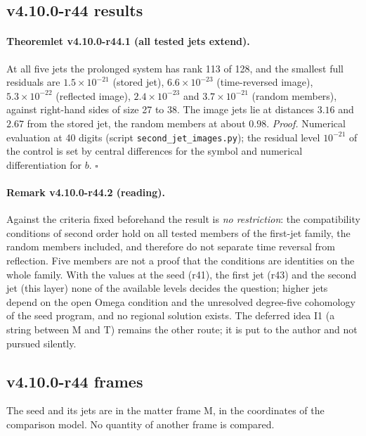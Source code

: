\subsection*{v4.10.0-r44 results}
\label{subsec:v4100-r44-results}

\paragraph{Theoremlet v4.10.0-r44.1 (all tested jets extend).}
At all five jets the prolonged system has rank 113 of 128, and the smallest full residuals are \(1.5\times10^{-21}\) (stored jet),
\(6.6\times10^{-23}\) (time-reversed image), \(5.3\times10^{-22}\) (reflected image), \(2.4\times10^{-23}\) and \(3.7\times10^{-21}\) (random members), against
right-hand sides of size 27 to 38.  The image jets lie at distances \(3.16\) and \(2.67\) from the stored jet, the random members at about \(0.98\).
\emph{Proof.} Numerical evaluation at 40 digits (script \texttt{second\_\allowbreak jet\_\allowbreak images.py}); the residual level \(10^{-21}\) of the control is set by
central differences for the symbol and numerical differentiation for \(b\).  \(\square\)

\paragraph{Remark v4.10.0-r44.2 (reading).}
Against the criteria fixed beforehand the result is \emph{no restriction}: the compatibility conditions of second order hold on all tested
members of the first-jet family, the random members included, and therefore do not separate time reversal from reflection.  Five members are
not a proof that the conditions are identities on the whole family.  With the values at the seed (r41), the first jet (r43) and the second jet
(this layer) none of the available levels decides the question; higher jets depend on the open Omega condition and the unresolved degree-five
cohomology of the seed program, and no regional solution exists.  The deferred idea I1 (a string between M and T) remains the other route; it
is put to the author and not pursued silently.

\subsection*{v4.10.0-r44 frames}
\label{subsec:v4100-r44-frames}

The seed and its jets are in the matter frame M, in the coordinates of the comparison model.  No quantity of another frame is compared.


